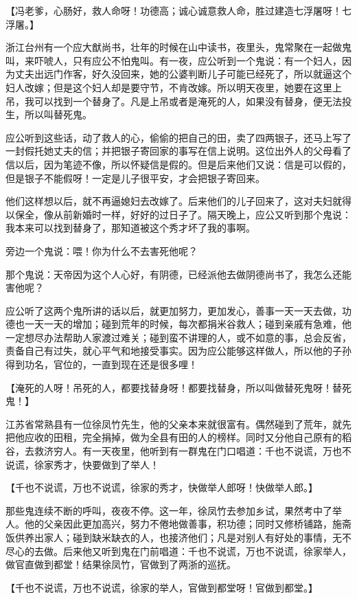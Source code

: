\documentclass[12pt,twoside,openany]{book}
\newcommand{\kai}[1]{{\CJKfamily{kai}#1}}
\begin{document}
【\kai{冯老爹，心肠好，救人命呀！功德高；诚心诚意救人命，胜过建造七浮屠呀！七浮屠。}】

浙江台州有一个应大猷尚书，壮年的时候在山中读书，夜里头，鬼常聚在一起做鬼叫，来吓唬人，只有应公不怕鬼叫。有一夜，应公听到一个鬼说：有一个妇人，因为丈夫出远门作客，好久没回来，她的公婆判断儿子可能已经死了，所以就逼这个妇人改嫁；但是这个妇人却是要守节，不肯改嫁。所以明天夜里，她要在这里上吊，我可以找到一个替身了。凡是上吊或者是淹死的人，如果没有替身，便无法投生，所以叫替死鬼。

应公听到这些话，动了救人的心，偷偷的把自己的田，卖了四两银子，还马上写了一封假托她丈夫的信；并把银子寄回家的事写在信上说明。这位出外人的父母看了信以后，因为笔迹不像，所以怀疑信是假的。但是后来他们又说：信是可以假的，但是银子不能假呀！一定是儿子很平安，才会把银子寄回来。

他们这样想以后，就不再逼媳妇去改嫁了。后来他们的儿子回来了，这对夫妇就得以保全，像从前新婚时一样，好好的过日子了。隔天晚上，应公又听到那个鬼说：我本来可以找到替身了，那知道被这个秀才坏了我的事啊。

旁边一个鬼说：喂！你为什么不去害死他呢？

那个鬼说：天帝因为这个人心好，有阴德，已经派他去做阴德尚书了，我怎么还能害他呢？

应公听了这两个鬼所讲的话以后，就更加努力，更加发心，善事一天一天去做，功德也一天一天的增加；碰到荒年的时候，每次都捐米谷救人；碰到亲戚有急难，他一定想尽办法帮助人家渡过难关；碰到蛮不讲理的人，或不如意的事，总会反省，责备自己有过失，就心平气和地接受事实。因为应公能够这样做人，所以他的子孙得到功名，官位的，一直到现在还是很多哩！

【\kai{淹死的人呀！吊死的人，都要找替身呀！都要找替身，所以叫做替死鬼呀！替死鬼！}】

江苏省常熟县有一位徐凤竹先生，他的父亲本来就很富有。偶然碰到了荒年，就先把他应收的田租，完全捐掉，做为全县有田的人的榜样。同时又分他自己原有的稻谷，去救济穷人。有一天夜里，他听到有一群鬼在门口唱道：千也不说谎，万也不说谎，徐家秀才，快要做到了举人！

【\kai{千也不说谎，万也不说谎，徐家的秀才，快做举人郎呀！快做举人郎。}】

那些鬼连续不断的呼叫，夜夜不停。这一年，徐凤竹去参加乡试，果然考中了举人。他的父亲因此更加高兴，努力不倦地做善事，积功德；同时又修桥铺路，施斋饭供养出家人；碰到缺米缺衣的人，也接济他们；凡是对别人有好处的事情，无不尽心的去做。后来他又听到鬼在门前唱道：千也不说谎，万也不说谎，徐家举人，做官直做到都堂！结果徐凤竹，官做到了两浙的巡抚。

【\kai{千也不说谎，万也不说谎，徐家的举人，官做到都堂呀！官做到都堂。}】
\end{document}
